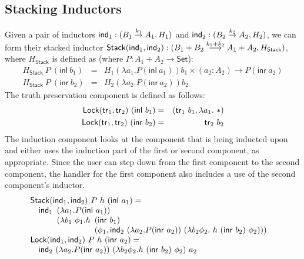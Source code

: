 \documentclass{amsart}
\newcommand{\Set}{\mathsf{Set}}
\begin{document}
\subsection{Stacking Inductors}

\newcommand{\inl}{\mathsf{inl}}
\newcommand{\inr}{\mathsf{inr}}

Given a pair of inductors $\mathsf{ind}_1 : (B_1 \stackrel{k_1}\to A_1, H_1)$
and $\mathsf{ind}_2 : (B_2 \stackrel{k_2}\to A_2, H_2)$, we can form their
stacked inductor $\mathsf{Stack}(\mathsf{ind}_1, \mathsf{ind}_2) : (B_1 + B_2
\stackrel{k_1 + k_2}\longrightarrow A_1 + A_2, H_{\mathsf{Stack}})$,
where $H_{\mathsf{Stack}}$ is defined as (where $P : A_1 + A_2 \to
\Set$):
\begin{eqnarray*}
  H_{\mathsf{Stack}}\ P\ (\inl\ b_1) &=& H_1(\lambda a_1. P (\inl\ a_1))b_1 \times (a_2 : A_2) \to P(\inr\ a_2)\\
  H_{\mathsf{Stack}}\ P\ (\inr\ b_2) &=& H_2(\lambda a_2. P (\inr\ a_2))b_2
\end{eqnarray*}
The truth preservation component is defined as follows:
\begin{eqnarray*}
  \mathsf{Lock}(\truth_1, \truth_2)\ (\inl\ b_1) &=& (\truth_1\ b_1, \lambda a_1.\ *)\\
  \mathsf{Lock}(\truth_1, \truth_2)\ (\inr\ b_2) &=& \truth_2\ b_2
\end{eqnarray*}
The induction component looks at the component that is being inducted
upon and either uses the induction part of the first or second
component, as appropriate. Since the user can step down from the first
component to the second component, the handler for the first component
also includes a use of the second component's inductor.
\begin{displaymath}
  \begin{array}[t]{l}
    \mathsf{Stack}(\ind_1,\ind_2)\ P\ h\ (\inl\ a_1) = \\
    \quad \ind_1
    \begin{array}[t]{l}
      (\lambda a_1. P(\inl\ a_1)) \\
      (\lambda b_1\ \phi_1. h
      \begin{array}[t]{l}
        (\inr\ b_1) \\
        (\phi_1, \ind_2\ (\lambda a_2. P(\inr\ a_2))\ (\lambda b_2 \phi_2.\ h\ (\inr\ b_2)\ \phi_2)))
      \end{array}
    \end{array}
    \\
    \mathsf{Lock}(\ind_1,\ind_2)\ P\ h\ (\inr\ a_2) = \\
    \quad \ind_2\ (\lambda a_2. P(\inr\ a_2))\ (\lambda b_2 \phi_2. h\ (\inr\ b_2)\ \phi_2)\ a_2
  \end{array}
\end{displaymath}
\end{document}
